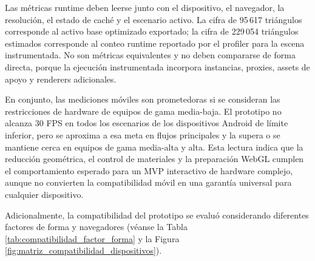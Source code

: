 

Las métricas runtime deben leerse junto con el dispositivo, el navegador, la resolución, el estado de caché y el escenario activo. La cifra de 95\,617 triángulos corresponde al activo base optimizado exportado; la cifra de 229\,054 triángulos estimados corresponde al conteo runtime reportado por el profiler para la escena instrumentada. No son métricas equivalentes y no deben compararse de forma directa, porque la ejecución instrumentada incorpora instancias, proxies, assets de apoyo y renderers adicionales.

En conjunto, las mediciones móviles son prometedoras si se consideran las restricciones de hardware de equipos de gama media-baja. El prototipo no alcanza 30 FPS en todos los escenarios de los dispositivos Android de límite inferior, pero se aproxima a esa meta en flujos principales y la supera o se mantiene cerca en equipos de gama media-alta y alta. Esta lectura indica que la reducción geométrica, el control de materiales y la preparación WebGL cumplen el comportamiento esperado para un MVP interactivo de hardware complejo, aunque no convierten la compatibilidad móvil en una garantía universal para cualquier dispositivo.

Adicionalmente, la compatibilidad del prototipo se evaluó considerando diferentes factores de forma y navegadores (véanse la Tabla \ref{tab:compatibilidad_factor_forma} y la Figura \ref{fig:matriz_compatibilidad_dispositivos}).

